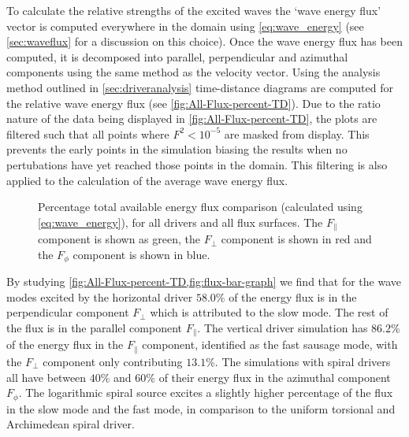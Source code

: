 \documentclass[a4paper,12pt,fourier,authoryear,custommargin]{Classes/PhDThesisPSnPDF}
\begin{document}
To calculate the relative strengths of the excited waves the `wave energy flux' vector is computed everywhere in the domain using \cref{eq:wave_energy} (see \cref{sec:waveflux} for a discussion on this choice).
Once the wave energy flux has been computed, it is decomposed into parallel, perpendicular and azimuthal components using the same method as the velocity vector. 
Using the analysis method outlined in \cref{sec:driveranalysis} time-distance diagrams are computed for the relative wave energy flux (see \cref{fig:All-Flux-percent-TD}). 
Due to the ratio nature of the data being displayed in \cref{fig:All-Flux-percent-TD}, the plots are filtered such that all points where $F^2 < 10^{-5}$ are masked from display.
This prevents the early points in the simulation biasing the results when no pertubations have yet reached those points in the domain.
This filtering is also applied to the calculation of the average wave energy flux.




\begin{figure}[h]
    \centering
    \caption{Percentage total available energy flux comparison (calculated using \cref{eq:wave_energy}), for all drivers and all flux surfaces. The $F_\parallel$ component is shown as green, the $F_\perp$ component is shown in red and the $F_\phi$ component is shown in blue.}
    \label{fig:flux-bar-graph}
\end{figure}


By studying \cref{fig:All-Flux-percent-TD,fig:flux-bar-graph} we find that for the wave modes excited by the horizontal driver $58.0$\% of the energy flux is in the perpendicular component $F_\perp$ which is attributed to the slow mode.
The rest of the flux is in the parallel component $F_\parallel$. 
The vertical driver simulation has $86.2$\% of the energy flux in the $F_\parallel$ component, identified as the fast sausage mode, with the $F_\perp$ component only contributing $13.1$\%. 
The simulations with spiral drivers all have between $40$\% and $60$\% of their energy flux in the azimuthal component $F_\phi$. 
The logarithmic spiral source excites a slightly higher percentage of the flux in the slow mode and the fast mode, in comparison to the uniform torsional and Archimedean spiral driver.
\end{document}
